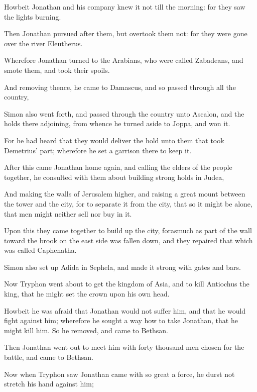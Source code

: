 {\par }{\PP {}Howbeit Jonathan and his company knew it not till the morning: for they saw the lights burning.
\par }{\PP {}Then Jonathan pursued after them, but overtook them not: for they were gone over the river Eleutherus.
\par }{\PP {}Wherefore Jonathan turned to the Arabians, who were called Zabadeans, and smote them, and took their spoils.
\par }{\PP {}And removing thence, he came to Damascus, and so passed through all the country,
\par }{\PP {}Simon also went forth, and passed through the country unto Ascalon, and the holds there adjoining, from whence he turned aside to Joppa, and won it.
\par }{\PP {}For he had heard that they would deliver the hold unto them that took Demetrius’ part; wherefore he set a garrison there to keep it.
\par }{\PP {}After this came Jonathan home again, and calling the elders of the people together, he consulted with them about building strong holds in Judea,
\par }{\PP {}And making the walls of Jerusalem higher, and raising a great mount between the tower and the city, for to separate it from the city, that so it might be alone, that men might neither sell nor buy in it.
\par }{\PP {}Upon this they came together to build up the city, forasmuch as part of the wall toward the brook on the east side was fallen down, and they repaired that which was called Caphenatha.
\par }{\PP {}Simon also set up Adida in Sephela, and made it strong with gates and bars.
\par }{\PP {}Now Tryphon went about to get the kingdom of Asia, and to kill Antiochus the king, that he might set the crown upon his own head.
\par }{\PP {}Howbeit he was afraid that Jonathan would not suffer him, and that he would fight against him; wherefore he sought a way how to take Jonathan, that he might kill him. So he removed, and came to Bethsan.
\par }{\PP {}Then Jonathan went out to meet him with forty thousand men chosen for the battle, and came to Bethsan.
\par }{\PP {}Now when Tryphon saw Jonathan came with so great a force, he durst not stretch his hand against him;
}
